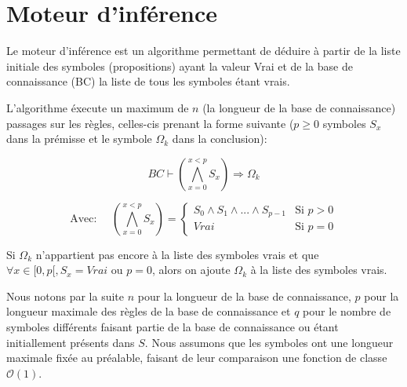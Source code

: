 \documentclass[12pt]{article}
\begin{document}
\section{Moteur d'inférence}

Le moteur d'inférence est un algorithme permettant de déduire à partir de la liste initiale des symboles (propositions) ayant la valeur \og Vrai \fg et de la base de connaissance (BC) la liste de tous les symboles étant vrais.

L'algorithme éxecute un maximum de $n$ (la longueur de la base de connaissance) passages sur les règles, celles-cis prenant la forme suivante ($p \geq 0$ symboles $S_x$ dans la prémisse et le symbole $\Omega_k$ dans la conclusion):

\[BC \vdash (\bigwedge_{x=0}^{x < p} S_x) \Rightarrow \Omega_k\]

\[\text{Avec: } \quad (\bigwedge_{x=0}^{x < p} S_x) = \begin{cases}
  S_0 \land S_1 \land ... \land S_{p-1} & \text{Si } p > 0 \\
  Vrai & \text{Si } p = 0
\end{cases}
\]

Si $\Omega_k$ n'appartient pas encore à la liste des symboles vrais et que $\forall x \in [0, p[, S_x = Vrai$ ou $p = 0$, alors on ajoute $\Omega_k$ à la liste des symboles vrais.

Nous notons par la suite $n$ pour la longueur de la base de connaissance, $p$ pour la longueur maximale des règles de la base de connaissance et $q$ pour le nombre de symboles différents faisant partie de la base de connaissance ou étant initiallement présents dans $S$.
Nous assumons que les symboles ont une longueur maximale fixée au préalable, faisant de leur comparaison une fonction de classe $\mathcal{O}(1)$.
\end{document}
